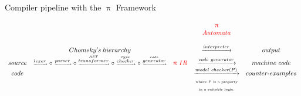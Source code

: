 \documentclass{beamer}
\begin{document}
\begin{frame}[shrink]{Compiler pipeline with the {\color{red}$\uppi$ Framework}}

\begin{adjustbox}{width=\textwidth,center}
$\begin{array}{ccccccccc}
             &                                                                                                                                                                                                                                                                                             &               &  \color{red}{\uppi} & \\
	     &                                                                                                                                                                                                                                                                                             &               &  \color{red}{Automata} & \\ \\
	     &                                                                           {\tiny Chomsky's \ hierarchy}                                                                                                                                                                                                                  &               &  \xrightarrow{interpreter} & output \\     
source  & {\tiny \xrightarrow{lexer} \circ \xrightarrow{parser}  \circ \xrightarrow{\stackrel{AST}{transformer}} \circ \xrightarrow{\stackrel{type}{checker}} \circ \xrightarrow{\stackrel{code}{generator}}} & \color{red}{\uppi \ IR} & \xrightarrow{code \ generator} & machine \ code \\
code             &                                                                                                                                                                                                                                                                                            &                 & \xrightarrow{model \ checker(P)} & counter\mbox{-}examples  \\
            &                                                                                                                                                                                                                                                                                             &                 & \text{\tiny where $P$ is a property}        &    \\
            &                                                                                                                                                                                                                                                                                             &                 & \text{\tiny in a suitable logic.}        &   \\           
\end{array}$
\end{adjustbox}


\end{frame}
\end{document}
